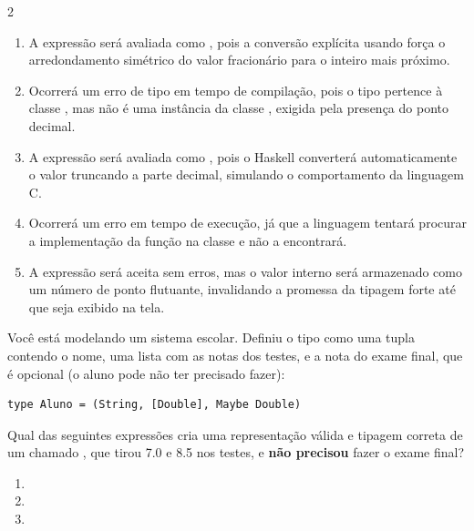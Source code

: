 \documentclass[a4paper,10pt,brazil]{article}
\begin{document}
\begin{multicols}{2}
\begin{enumerate}
  \item A expressão será avaliada como , pois a conversão explícita usando \haskellinline{::} força o arredondamento simétrico do valor fracionário para o inteiro mais próximo.

  \item Ocorrerá um erro de tipo em tempo de compilação, pois o tipo  pertence à classe , mas não é uma instância da classe , exigida pela presença do ponto decimal.

  \item A expressão será avaliada como , pois o Haskell converterá automaticamente o valor truncando a parte decimal, simulando o comportamento da linguagem C.

  \item Ocorrerá um erro em tempo de execução, já que a linguagem tentará procurar a implementação da função  na classe  e não a encontrará.

  \item A expressão será aceita sem erros, mas o valor interno será armazenado como um número de ponto flutuante, invalidando a promessa da tipagem forte até que seja exibido na tela.


\end{enumerate}

Você está modelando um sistema escolar. Definiu o tipo  como uma tupla contendo o nome, uma lista com as notas dos testes, e a nota do exame final, que é opcional (o aluno pode não ter precisado fazer):
\begin{verbatim}
type Aluno = (String, [Double], Maybe Double)
\end{verbatim}

Qual das seguintes expressões cria uma representação válida e tipagem correta de um  chamado , que tirou 7.0 e 8.5 nos testes, e \textbf{não precisou} fazer o exame final?

\begin{enumerate}
  \item {}

  \item {}

  \item {}


\end{enumerate}
\end{multicols}
\end{document}
